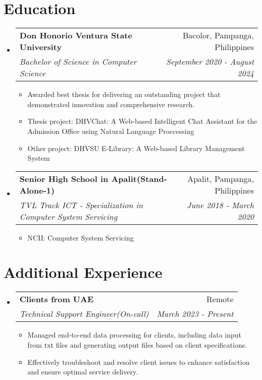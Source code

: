 \documentclass[letterpaper,11pt]{article}
\makeatletter
\newcommand{\resumeItem}[1]{\item\small{#1}}
\newcommand{\resumeSubheading}[4]{
  \vspace{-1pt}\item
    \begin{tabular*}{0.97\textwidth}[t]{l@{\extracolsep{\fill}}r}
      \textbf{#1} & #2 \\
      \textit{\small#3} & \textit{\small #4} \\
    \end{tabular*}\vspace{-5pt}
}
\newcommand{\resumeSubItem}[1]{\item{\small#1\vspace{-4pt}}}
\newcommand{\resumeSubHeadingListStart}{\begin{itemize}[leftmargin=*]}
\newcommand{\resumeSubHeadingListEnd}{\end{itemize}}
\newcommand{\resumeItemListStart}{\begin{itemize}}
\newcommand{\resumeItemListEnd}{\end{itemize}\vspace{-5pt}}
\makeatother
\begin{document}
\section{Education}
\resumeSubHeadingListStart
\resumeSubheading
{Don Honorio Ventura State University}{Bacolor, Pampanga, Philippines}
{Bachelor of Science in Computer Science}{September 2020 - August 2024}
\resumeItemListStart
\resumeItem
{Awarded best thesis for delivering an outstanding project that demonstrated innovation and comprehensive research.}
\resumeItem
{Thesis project: DHVChat: A Web-based Intelligent Chat Assistant for the Admission Office using Natural Language Proccessing}
\resumeItem
{Other project: DHVSU E-Library: A Web-based Library Management System}
\resumeItemListEnd


\resumeSubheading
{Senior High School in Apalit(Stand-Alone-1)}{Apalit, Pampanga, Philippines}
{TVL Track ICT - Specialization in Computer System Servicing}{June 2018 - March 2020}
\resumeItemListStart
\resumeItem
{NCII: Computer System Servicing}
\resumeItemListEnd
\resumeSubHeadingListEnd

\section{Additional Experience}
\resumeSubHeadingListStart

\resumeSubheading
{Clients from UAE}{Remote}
{Technical Support Engineer(On-call)}{March 2023 - Present}
\resumeItemListStart
\resumeItem
{Managed end-to-end data processing for clients, including data input from txt files and generating output files based on client specifications.}
\resumeItem
{Effectively troubleshoot and resolve client issues to enhance satisfaction and ensure optimal service delivery.}
\resumeItemListEnd

\resumeSubHeadingListEnd

\end{document}
